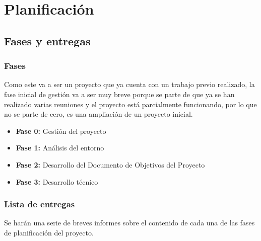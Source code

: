 \chapter{Planificación}

\section{Fases y entregas}

\subsection{Fases}

Como este va a ser un proyecto que ya cuenta con un trabajo previo realizado, la fase inicial de gestión va a ser muy breve
porque se parte de que ya se han realizado varias reuniones y el proyecto está parcialmente funcionando, por lo que no se parte
de cero, es una ampliación de un proyecto inicial.

\begin{itemize}
  \item \textbf{Fase 0:} Gestión del proyecto
  \item \textbf{Fase 1:} Análisis del entorno
  \item \textbf{Fase 2:} Desarrollo del Documento de Objetivos del Proyecto
  \item \textbf{Fase 3:} Desarrollo técnico
\end{itemize}

\subsection{Lista de entregas}

Se harán una serie de breves informes sobre el contenido de cada una de las fases de planificación del proyecto.

